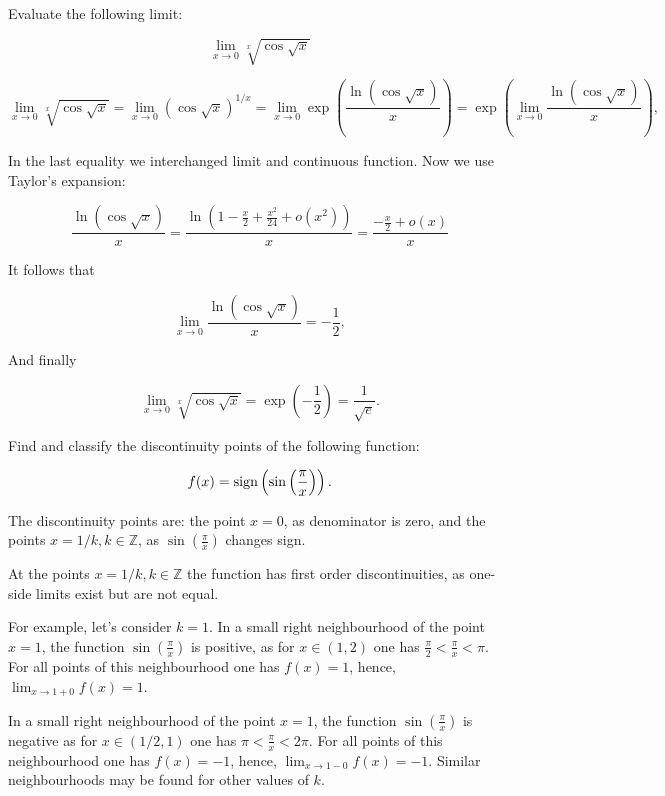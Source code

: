 \documentclass[addpoints, answers]{exam} %
\begin{document}
\begin{questions}

\question[10] Evaluate the following limit:

\[
\lim_{x \to 0} \sqrt[x]{\cos \sqrt{x}}
\]

\begin{solution}

\[
\lim_{x \rightarrow 0} \sqrt[x]{\cos \sqrt{x}} = \lim_{x \rightarrow 0} \left({\cos \sqrt{x}}\right) ^{1/x} =  \lim_{x \rightarrow 0} \exp
\left( \frac{\ln (\cos \sqrt{x})}{x} \right) = \exp \left( \lim_{x \rightarrow 0}
\frac{\ln (\cos \sqrt{x})}{x} \right),
\]

In the last equality we interchanged limit and continuous function. Now we use Taylor's expansion:

\[
\frac{\ln (\cos \sqrt{x})}{x} = \frac{\ln (1-
\frac{x}{2}+\frac{x^2}{24}+o(x^2))}{x} = \frac{-\frac{x}{2}+o(x)}{x}
\]

\noindent It follows that

\[
\lim_{x \rightarrow 0} \frac{\ln (\cos \sqrt{x})}{x} = -\frac{1}{2},
\]

\noindent And finally

\[
\lim_{x \rightarrow 0} \sqrt[x]{\cos \sqrt{x}} = \exp \left( -\frac{1}{2}\right) = \frac{1}{\sqrt{e}}.
\]
\end{solution}

\question[10] Find and classify the discontinuity points of the following function:

\[
f(x) = {\operatorname{sign}} \left(\sin \left( \frac{\pi}{x}\right)\right).
\]

\begin{solution}
The discontinuity points are: the point $x=0$, as denominator is zero, and the points $x=1/k, k \in \mathbb{Z}$, as $\sin \left( \frac{\pi}{x}\right)$ changes sign.


At the points $x=1/k, k \in \mathbb{Z}$ the function has first order discontinuities, as one-side limits exist but are not equal.

For example, let's consider $k=1$. In a small right neighbourhood of the point $x=1$, the function $\sin \left( \frac{\pi}{x} \right)$ is positive, as for $x \in (1,2)$ one has $\frac{\pi}{2} < \frac{\pi}{x} < \pi$. For all points of this neighbourhood one has $f(x) = 1$, hence, $\lim_{x \rightarrow 1+0} f(x) = 1$.

In a small right neighbourhood of the point $x=1$, the function $\sin \left( \frac{\pi}{x} \right)$ is negative as for $x \in (1/2,1)$ one has $\pi < \frac{\pi}{x} < 2 \pi$. For all points of this neighbourhood one has $f(x) = -1$, hence, $\lim_{x \rightarrow 1-0} f(x) = -1$. Similar neighbourhoods may be found for other values of $k$.




\end{solution}
\end{questions}
\end{document}
